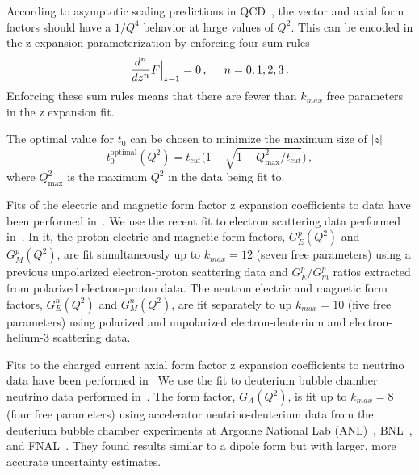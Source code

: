   According to asymptotic scaling predictions in QCD~\cite{Lepage:1980fj}, the
  vector and axial form factors should have a $1/Q^4$ behavior at large values
  of $Q^2$. This can be encoded in the z expansion parameterization by
  enforcing four sum rules~\cite{Lee:2015jqa}
  \begin{align}\label{eq:zsumrules}
    \frac{d^n}{dz^n} F\Big\rvert_{z=1} = 0\,, \hspace{5mm} n=0,1,2,3 \,.
  \end{align}
  Enforcing these sum rules means that there are fewer than $k_{max}$ free
  parameters in the z expansion fit.

  The optimal value for $t_0$ can be chosen to minimize the maximum size of
  $|z|$~\cite{Meyer:2016oeg}
  \begin{equation}\label{eq:topt}
    t_0^{\textrm{optimal}}(Q^2) = t_{cut}\Big(1 - \sqrt{1+Q^2_{\textrm{max}}/t_{cut}}\Big) \,,
  \end{equation}
  where $Q^2_{\textrm{max}}$ is the maximum $Q^2$ in the data being fit to.

  Fits of the electric and magnetic form factor z expansion coefficients to
  data have been performed
  in~\cite{Hill:2010yb,Epstein:2014zua,Lee:2015jqa,Ye:2017gyb}.  We use the
  recent fit to electron scattering data performed in~\cite{Ye:2017gyb}. In it,
  the proton electric and magnetic form factors, $G_E^p(Q^2)$ and $G_M^p(Q^2)$,
  are fit simultaneously up to $k_{max} = 12$ (seven free parameters) using a
  previous unpolarized electron-proton scattering data and $G_E^p/G_m^p$ ratios
  extracted from polarized electron-proton data. The neutron electric and
  magnetic form factors, $G_E^n(Q^2)$ and $G_M^n(Q^2)$, are fit separately to
  up $k_{max} = 10$ (five free parameters) using polarized and unpolarized
  electron-deuterium and electron-helium-3 scattering data.

  Fits to the charged current axial form factor z expansion coefficients to
  neutrino data have been performed
  in~\cite{Bhattacharya:2011ah,Bhattacharya:2015mpa,Meyer:2016oeg} We use the
  fit to deuterium bubble chamber neutrino data performed
  in~\cite{Meyer:2016oeg}. The form factor, $G_A(Q^2)$, is fit up to $k_{max} =
  8$ (four free parameters) using accelerator neutrino-deuterium data from the
  deuterium bubble chamber experiments at Argonne National Lab
  (ANL)~\cite{Mann:1973pr,Barish:1977qk,Miller:1982qi},
  BNL~\cite{Baker:1981su}, and FNAL~\cite{Kitagaki:1983px}. They found results
  similar to a dipole form but with larger, more accurate uncertainty
  estimates.



